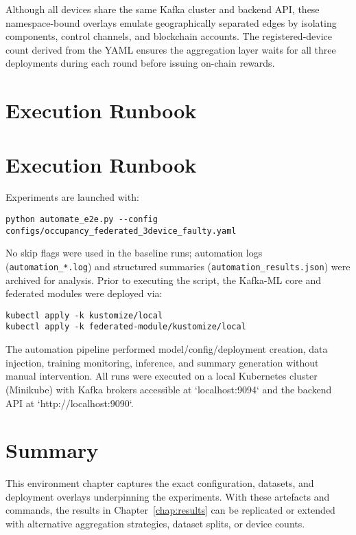 Although all devices share the same Kafka cluster and backend API, these namespace-bound overlays emulate geographically separated edges by isolating components, control channels, and blockchain accounts. The registered-device count derived from the YAML ensures the aggregation layer waits for all three deployments during each round before issuing on-chain rewards.

\section{Execution Runbook}
\label{sec:execution_runbook}


\section{Execution Runbook}
\label{sec:execution_runbook}

Experiments are launched with:

\begin{verbatim}
python automate_e2e.py --config configs/occupancy_federated_3device_faulty.yaml
\end{verbatim}

No skip flags were used in the baseline runs; automation logs (\texttt{automation\_*.log}) and structured summaries (\texttt{automation\_results.json}) were archived for analysis. Prior to executing the script, the Kafka-ML core and federated modules were deployed via:

\begin{verbatim}
kubectl apply -k kustomize/local
kubectl apply -k federated-module/kustomize/local
\end{verbatim}

The automation pipeline performed model/config/deployment creation, data injection, training monitoring, inference, and summary generation without manual intervention. All runs were executed on a local Kubernetes cluster (Minikube) with Kafka brokers accessible at `localhost:9094` and the backend API at `http://localhost:9090`.

\section{Summary}

This environment chapter captures the exact configuration, datasets, and deployment overlays underpinning the experiments. With these artefacts and commands, the results in Chapter~\ref{chap:results} can be replicated or extended with alternative aggregation strategies, dataset splits, or device counts.


